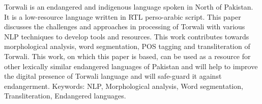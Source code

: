 Torwali is an endangered and indigenous language spoken in North of Pakistan. It is a low-resource language written in RTL perso-arabic script. This paper discusses the challenges and approaches in processing of Torwali with various NLP techniques to develop tools and resources. This work contributes towards morphological analysis, word segmentation, POS tagging and transliteration of Torwali. This work, on which this paper is based, can be used as a resource for other lexically similar endangered languages of Pakistan and will help to improve the digital presence of Torwali language and will safe-guard it against endangerment. Keywords: NLP, Morphological analysis, Word segmentation, Transliteration, Endangered languages.

